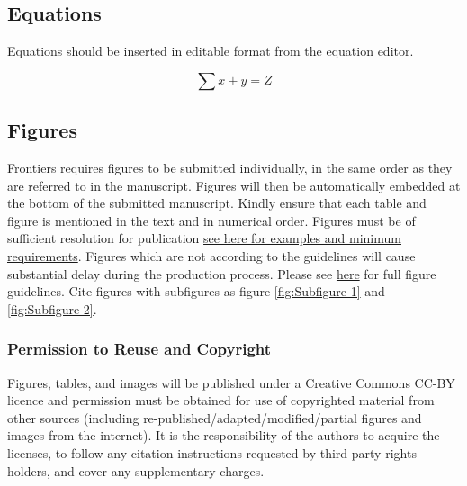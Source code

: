 \documentclass[utf8]{FrontiersinVancouver}
\begin{document}
\subsection{Equations}
Equations should be inserted in editable format from the equation editor.

\begin{equation}
\sum x+ y =Z\label{eq:01}
\end{equation}

\subsection{Figures}
Frontiers requires figures to be submitted individually, in the same order as they are referred to in the manuscript. Figures will then be automatically embedded at the bottom of the submitted manuscript. Kindly ensure that each table and figure is mentioned in the text and in numerical order. Figures must be of sufficient resolution for publication \href{https://www.frontiersin.org/about/author-guidelines#ImageSizeRequirements}{see here for examples and minimum requirements}. Figures which are not according to the guidelines will cause substantial delay during the production process. Please see \href{https://www.frontiersin.org/about/author-guidelines#FigureRequirementsStyleGuidelines}{here} for full figure guidelines. Cite figures with subfigures as figure \ref{fig:Subfigure 1} and \ref{fig:Subfigure 2}.


\subsubsection{Permission to Reuse and Copyright}
Figures, tables, and images will be published under a Creative Commons CC-BY licence and permission must be obtained for use of copyrighted material from other sources (including re-published/adapted/modified/partial figures and images from the internet). It is the responsibility of the authors to acquire the licenses, to follow any citation instructions requested by third-party rights holders, and cover any supplementary charges.
\end{document}
